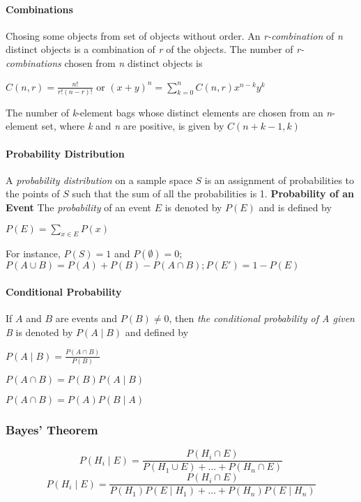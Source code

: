 \documentclass[10pt,twocolumn]{article}
\newenvironment{packed_list}{
\begin{itemize}
  \setlength{\itemsep}{1pt}
  \setlength{\parskip}{0pt}
  \setlength{\parsep}{0pt}
}{\end{itemize}}
\begin{document}
	\paragraph*{Combinations}
	Chosing some objects from set of objects without order.
	An \textit{r-combination} of \textit{n} distinct objects is a
        combination of \textit{r} of the objects. The number of
        \textit{r-combinations} chosen from \textit{n} distinct objects is
	\begin{center}$C(n,r)=\frac{n!}{r!(n-r)!}$ or $(x+y)^n=\sum_{k=0}^nC(n,r)x^{n-k}y^k$\end{center}
	The number of \textit{k}-element bags whose distinct elements
        are chosen from an \textit{n}-element set, where \textit{k}
        and \textit{n} are positive, is given by $C(n+k-1, k)$

	\paragraph*{Probability Distribution} A \emph{probability
          distribution} on a sample space $S$ is an assignment of
        probabilities to the points of $S$ such that the sum of all
        the probabilities is 1.
	\textbf{Probability of an Event} The \emph{probability} of an
        event $E$ is denoted by $P(E)$ and is defined by
	\begin{center}$P(E)=\sum_{x\in E}P(x)$\end{center}
	For instance, $P(S)=1$ and $P(\emptyset)=0$; $P(A\cup B)=P(A)+P(B)-P(A\cap B); P(E')=1-P(E)$
	
	\paragraph*{Conditional Probability} If $A$ and $B$ are events and
        $P(B)\neq0$, then \emph{the conditional probability of A given
          B} is denoted by $P(A\mid B)$ and defined by
	\begin{packed_list}
          \item $P(A\mid B)=\frac{P(A\cap B)}{P(B)}$
	\item $P(A\cap B)=P(B)P(A\mid B)$
	\item $P(A\cap B)=P(A)P(B\mid A)$
          \end{packed_list}

	\subsubsection*{Bayes' Theorem}
	\[P(H_i\mid E)=\frac{P(H_i\cap E)}{P(H_1\cup E)+\ldots+P(H_n\cap E)}\]
	\[P(H_i\mid E)=\frac{P(H_i\cap E)}{P(H_1)P(E\mid H_1)+\ldots+P(H_n)P(E\mid  H_n)}\]
	
\end{document}

